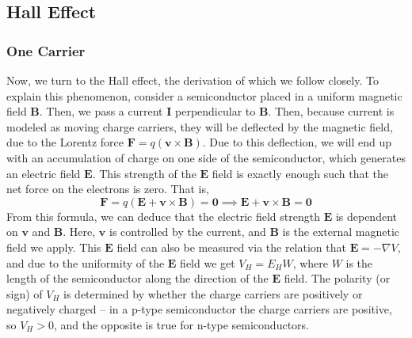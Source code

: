\documentclass[10pt]{article}
\begin{document}
	\subsection{Hall Effect} 
	
	\subsubsection{One Carrier}

	Now, we turn to the Hall effect, the derivation of which we follow \cite{neamen} closely. 
	To explain this phenomenon, consider a semiconductor placed in a uniform
	magnetic field \( \mathbf{B} \). Then, we pass a current \( \mathbf{I} \) perpendicular to \( \mathbf{B} \). Then,
	because current is modeled as moving charge carriers, they will be deflected by the magnetic field,
	due to the Lorentz force \( \mathbf{F} = q (\mathbf{v} \times \mathbf{B}) \). Due to this deflection, we
	will end up with an accumulation of charge on one side of the semiconductor, which generates an electric
	field \( \mathbf{E} \). This strength of the \( \mathbf{E} \) field is exactly enough such that the net
	force on the electrons is zero. That is, 
	\begin{equation}
		\label{hall-effect}
		\mathbf{F} = q(\mathbf{E} + \mathbf{v} \times \mathbf{B}) = \mathbf{0} \implies \mathbf{E} +
		\mathbf{v} \times \mathbf{B} = \mathbf{0}
	\end{equation}
	From this formula, we can deduce that the electric field strength \( \mathbf{E} \) is dependent on \(
	\mathbf{v} \) and \( \mathbf{B} \). Here, \( \mathbf{v} \) is controlled by the current, and \( \mathbf{B}
	\) is the external magnetic field we apply. This \( \mathbf{E} \) field can also be measured via the
	relation that \( \mathbf{E} = -\nabla V \), and due to the uniformity of the \( \mathbf{E} \) field we get \( V_H
	= E_H W\), where \( W \) is the length of the semiconductor along the direction of the \( \mathbf{E}
	\) field. The polarity (or sign) of \( V_H \) is determined by whether the charge carriers are positively
	or negatively charged -- in a p-type semiconductor the charge carriers are positive, so \( V_H > 0 \),
	and the opposite is true for n-type semiconductors. 
\end{document}
